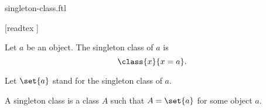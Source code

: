 \documentclass{stex}
\begin{document}
\begin{smodule}{singleton-class.ftl}

  \begin{forthel}

    [readtex ]
  \end{forthel}

  \begin{forthel}
    \begin{definition}
      Let $a$ be an object.
      The singleton class of $a$ is
      \[\class{x}{x = a}.\]
    \end{definition}

    Let $\set{a}$ stand for the singleton class of $a$.
  \end{forthel}

  \begin{forthel}
    \begin{definition}
      A singleton class is a class $A$ such that $A = \set{a}$ for some object $a$.
    \end{definition}
  \end{forthel}
\end{smodule}
\end{document}
